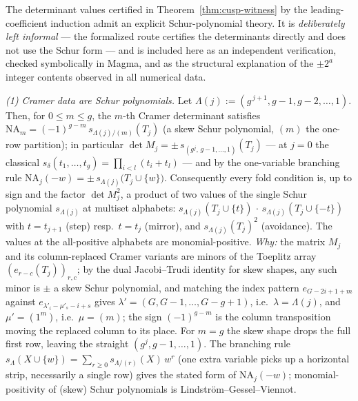 \begin{remark}
\label{rem:schur-atoms}
The determinant values certified in Theorem~\ref{thm:cusp-witness} by the
leading-coefficient induction admit an explicit Schur-polynomial theory. It is
\emph{deliberately left informal} --- the formalized route certifies the determinants
directly and does not use the Schur form --- and is included here as an independent
verification, checked symbolically in Magma, and as the structural explanation of the
$\pm 2^a$ integer contents observed in all numerical data.

\emph{(1) Cramer data are Schur polynomials.}
Let $\Lambda(j) := (g^{\,j+1}, g-1, g-2, \dots, 1)$. Then, for $0 \le m \le g$, the
$m$-th Cramer determinant satisfies
$\mathrm{NA}_m = (-1)^{g-m}\, s_{\Lambda(j)/(m)}(T_j)$ (a skew Schur polynomial, $(m)$
the one-row partition); in particular
$\det M_j = \pm\, s_{(g^j,\, g-1, \dots, 1)}(T_j)$ --- at $j = 0$ the classical
$s_{\delta}(t_1, \dots, t_g) = \prod_{i < l}(t_i + t_l)$ --- and by the one-variable
branching rule $\mathrm{NA}_j(-w) = \pm\, s_{\Lambda(j)}\bigl(T_j \cup \{w\}\bigr)$.
Consequently every fold condition is, up to sign and the factor $\det M_j^{2}$, a
product of two values of the single Schur polynomial $s_{\Lambda(j)}$ at multiset
alphabets: $s_{\Lambda(j)}(T_j \cup \{t\})\, \cdot\, s_{\Lambda(j)}(T_j \cup \{-t\})$
with $t = t_{j+1}$ (step) resp.\ $t = t_j$ (mirror), and $s_{\Lambda(j)}(T_j)^2$
(avoidance). The values at the all-positive alphabets are monomial-positive.
\emph{Why:} the matrix $M_j$ and its column-replaced Cramer variants are minors of the
Toeplitz array $(e_{r-c}(T_j))_{r,c}$; by the dual Jacobi--Trudi identity for skew
shapes, any such minor is $\pm$ a skew Schur polynomial, and matching the index pattern
$e_{G-2i+1+m}$ against $e_{\lambda'_i - \mu'_s - i + s}$ gives
$\lambda' = (G, G-1, \dots, G-g+1)$, i.e.\ $\lambda = \Lambda(j)$, and $\mu' = (1^m)$,
i.e.\ $\mu = (m)$; the sign $(-1)^{g-m}$ is the column transposition moving the
replaced column to its place. For $m = g$ the skew shape drops the full first row,
leaving the straight $(g^j, g-1, \dots, 1)$. The branching rule
$s_{\Lambda}(X \cup \{w\}) = \sum_{r \ge 0} s_{\Lambda/(r)}(X)\, w^r$ (one extra
variable picks up a horizontal strip, necessarily a single row) gives the stated form of
$\mathrm{NA}_j(-w)$; monomial-positivity of (skew) Schur polynomials is
Lindstr\"om--Gessel--Viennot.


\end{remark}
